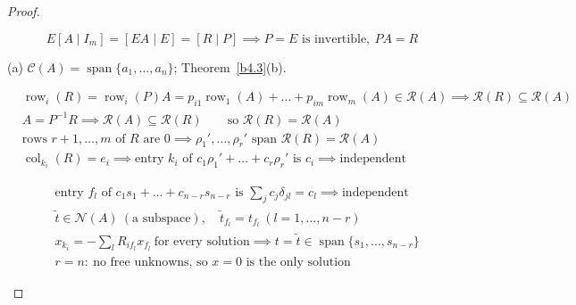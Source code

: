 \documentclass[12pt]{article}
\DeclareMathOperator{\col}{col}
\DeclareMathOperator{\Span}{span}
\theoremstyle{definition}
\newcommand{\boardtop}{\vspace*{-\abovedisplayskip}}
\DeclareMathOperator{\row}{row}
\begin{document}
\begin{proof}
\begin{board}[\(P\) and \(PA=R\): the row operations multiply on the left by an invertible \(E\) (\lec{2},
\lit{Theorem~14}(c)); column by column (\lec{1}, \lit{Theorem~4}(a)):]
\[
E[A\mid I_m]=[EA\mid E]=[R\mid P]\implies P=E\text{ is invertible},\ PA=R
\]
\end{board}
(a) \(\mathcal C(A)=\Span\{a_1,\dots,a_n\}\); Theorem~\ref{b4.3}(b).
\begin{board}[(b) \(P=(p_{ij})\); \lec{1}, \lit{Theorem~4}(c); \lec{3}, \lit{Theorem~7}: a span is the smallest subspace containing
its vectors:]
\boardtop
\begin{align*}
&\row_i(R)=\row_i(P)A=p_{i1}\row_1(A)+\dots+p_{im}\row_m(A)\in\mathcal R(A)\implies\mathcal R(R)\subseteq\mathcal R(A)\\
&A=P^{-1}R\implies\mathcal R(A)\subseteq\mathcal R(R)\qquad\text{so }\mathcal R(R)=\mathcal R(A)\\
&\text{rows }r+1,\dots,m\text{ of }R\text{ are }0\implies\rho_1',\dots,\rho_r'\text{ span }\mathcal R(R)=\mathcal R(A)\\
&\col_{k_i}(R)=e_i\implies\text{entry }k_i\text{ of }c_1\rho_1'+\dots+c_r\rho_r'\text{ is }c_i\implies\text{independent}
\end{align*}
\end{board}
\begin{board}[(c) \(Ax=0\iff Rx=0\) (\lec{2}, \lit{Theorem~3}(b)); pivot unknowns from free ones (\lec{2},
\lit{Proposition~7}(b)); \(\mathcal N(A)\) is closed under linear combinations (\lec{3}, \lit{Theorem~4}); \(t\in\mathcal N(A)\),
\(\tilde t=t_{f_1}s_1+\dots+t_{f_{n-r}}s_{n-r}\):]
\boardtop
\begin{align*}
&\text{entry }f_l\text{ of }c_1s_1+\dots+c_{n-r}s_{n-r}\text{ is }\textstyle\sum_jc_j\delta_{jl}=c_l\implies\text{independent}\\
&\tilde t\in\mathcal N(A)\ (\text{a subspace}),\quad\tilde t_{f_l}=t_{f_l}\ (l=1,\dots,n-r)\\
&x_{k_i}=-\textstyle\sum_lR_{if_l}x_{f_l}\ \text{for every solution}\implies t=\tilde t\in\Span\{s_1,\dots,s_{n-r}\}\\
&r=n:\ \text{no free unknowns, so }x=0\text{ is the only solution}
\end{align*}
\end{board}
\begin{board}

\end{board}
\end{proof}
\end{document}
